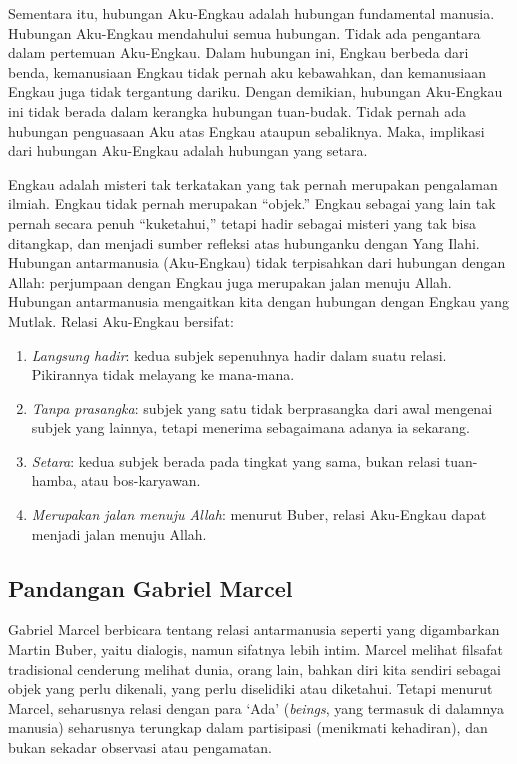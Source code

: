 \documentclass[11pt,twoside,a5paper,openany]{memoir}
\def\tightlist{}
\begin{document}
Sementara itu, hubungan Aku-Engkau adalah hubungan fundamental manusia.
Hubungan Aku-Engkau mendahului semua hubungan. Tidak ada pengantara
dalam pertemuan Aku-Engkau. Dalam hubungan ini, Engkau berbeda dari
benda, kemanusiaan Engkau tidak pernah aku kebawahkan, dan kemanusiaan
Engkau juga tidak tergantung dariku. Dengan demikian, hubungan
Aku-Engkau ini tidak berada dalam kerangka hubungan tuan-budak. Tidak
pernah ada hubungan penguasaan Aku atas Engkau ataupun sebaliknya. Maka,
implikasi dari hubungan Aku-Engkau adalah hubungan yang setara.

Engkau adalah misteri tak terkatakan yang tak pernah merupakan
pengalaman ilmiah. Engkau tidak pernah merupakan ``objek.'' Engkau
sebagai yang lain tak pernah secara penuh ``kuketahui,'' tetapi hadir
sebagai misteri yang tak bisa ditangkap, dan menjadi sumber refleksi
atas hubunganku dengan Yang Ilahi. Hubungan antarmanusia (Aku-Engkau)
tidak terpisahkan dari hubungan dengan Allah: perjumpaan dengan Engkau
juga merupakan jalan menuju Allah. Hubungan antarmanusia mengaitkan kita
dengan hubungan dengan Engkau yang Mutlak. Relasi Aku-Engkau bersifat:

\begin{enumerate}
\def\labelenumi{\arabic{enumi}.}
\tightlist
\item
  \emph{Langsung hadir}: kedua subjek sepenuhnya hadir dalam suatu
  relasi. Pikirannya tidak melayang ke mana-mana.
\item
  \emph{Tanpa prasangka}: subjek yang satu tidak berprasangka dari awal
  mengenai subjek yang lainnya, tetapi menerima sebagaimana adanya ia
  sekarang.
\item
  \emph{Setara}: kedua subjek berada pada tingkat yang sama, bukan
  relasi tuan-hamba, atau bos-karyawan.
\item
  \emph{Merupakan jalan menuju Allah}: menurut Buber, relasi Aku-Engkau
  dapat menjadi jalan menuju Allah.
\end{enumerate}

\hypertarget{pandangan-gabriel-marcel}{%
\subsection{Pandangan Gabriel Marcel}\label{pandangan-gabriel-marcel}}

Gabriel Marcel berbicara tentang relasi antarmanusia seperti yang
digambarkan Martin Buber, yaitu dialogis, namun sifatnya lebih intim.
Marcel melihat filsafat tradisional cenderung melihat dunia, orang lain,
bahkan diri kita sendiri sebagai objek yang perlu dikenali, yang perlu
diselidiki atau diketahui. Tetapi menurut Marcel, seharusnya relasi
dengan para `Ada' (\emph{beings}, yang termasuk di dalamnya manusia)
seharusnya terungkap dalam partisipasi (menikmati kehadiran), dan bukan
sekadar observasi atau pengamatan.
\end{document}
